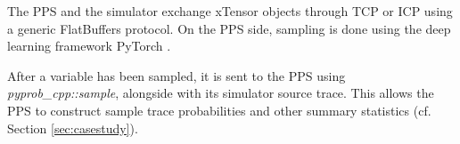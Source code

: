 \documentclass{article}
\newcommand{\bg}[1]{~{{[{\it \textcolor{red}{{\bf BG:} #1}}]}}}
\begin{document}
The PPS and the simulator exchange xTensor objects \cite{} through TCP or ICP using a generic FlatBuffers \cite{TODO} protocol. On the PPS side, sampling is done using the deep learning framework PyTorch \cite{}.

After a variable has been sampled, it is sent to the PPS using \textit{pyprob\_cpp::sample}, alongside with its simulator source trace. This allows the PPS to construct sample trace probabilities and other summary statistics (cf. Section \ref{sec:casestudy}). 

%
%
%
%
%
\end{document}
